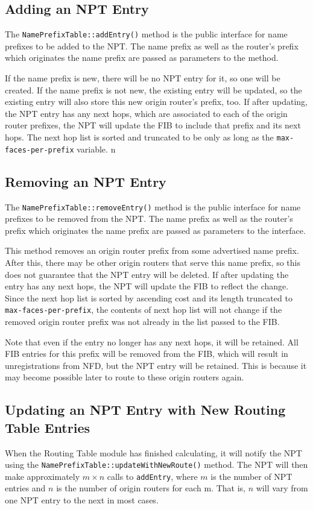\subsection{Adding an NPT Entry}
\label{sec:npt-add}
The \texttt{NamePrefixTable::addEntry()} method is the public
interface for name prefixes to be added to the NPT.
The name prefix as well as the router's prefix which originates the
name prefix are passed as parameters to the method.

If the name prefix is new, there will be no NPT entry for it, so one
will be created. If the name prefix is not new, the existing entry
will be updated, so the existing entry will also store this new origin
router's prefix, too. If after updating, the NPT entry has any next
hops, which are associated to each of the origin router prefixes, the
NPT will update the FIB to include that prefix and its next hops. The
next hop list is sorted and truncated to be only as long as the
\texttt{max-faces-per-prefix} variable.
n
\subsection{Removing an NPT Entry}
\label{sec:npt-del}
The \texttt{NamePrefixTable::removeEntry()} method is the public
interface for name prefixes to be removed from the NPT.
The name prefix as well as the router's prefix which originates the
name prefix are passed as parameters to the interface.

This method removes an origin router prefix from some advertised name
prefix. After this, there may be other origin routers that serve this
name prefix, so this does not guarantee that the NPT entry will be
deleted. If after updating the entry has any next hops, the NPT will
update the FIB to reflect the change. Since the next hop list is
sorted by ascending cost and its length truncated to
\texttt{max-faces-per-prefix}, the contents of next hop list will not
change if the removed origin router prefix was not already in the list
passed to the FIB.

Note that even if the entry no longer has any next hops, it will be retained. All FIB entries for this prefix will be removed from the FIB, which will result in unregistrations from NFD, but the NPT entry will be retained. This is because it may become possible later to route to these origin routers again.

\subsection{Updating an NPT Entry with New Routing Table Entries}
\label{sec:npt-update-with-new-route}
When the Routing Table module has finished calculating, it will notify
the NPT using the \texttt{NamePrefixTable::updateWithNewRoute()}
method.
The NPT will then make approximately $m \times n$ calls to
\texttt{addEntry}, where $m$ is the number of NPT entries and $n$ is
the number of origin routers for each m. That is, $n$ will vary from
one NPT entry to the next in most cases.

